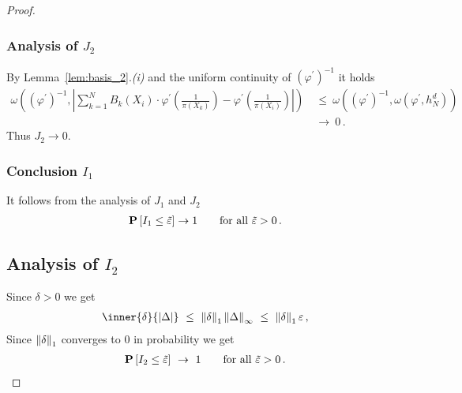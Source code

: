 \begin{proof}
\subsubsection*{Analysis of $J_2$}
By Lemma~\ref{lem:basis_2}.\textit{(i)}
and the uniform continuity of 
$
  (
  \varphi^{'}
  )
  ^{-1}
$
it holds
\begin{align*}
\omega
\left(
  (
  \varphi^{'}
  )
  ^{-1}
  ,
  \left|
    \sum_{k=1}^{N}
  B_k(X_i)
  \cdot
  \varphi^{'}
  \left(
    \frac
    {1}
    {\pi(X_k)}
  \right)
  -
  \varphi^{'}
  \left(
    \frac
    {1}
    {\pi(X_i)}
  \right)
  \right|
  \right)
  &
  \ 
  \le
  \ 
\omega
\left(
  (
  \varphi^{'}
  )
  ^{-1}
  ,
\omega
\left(
  \varphi^{'}
  ,
  h_N^d
  \right)
  \right)
  \\
  &
  \ 
  \to
  \ 
  0
  \,.
\end{align*}
Thus $J_2\to 0$.
\subsubsection*{Conclusion $I_1$}
It follows from the analysis of $J_1$ and $J_2$
\begin{align*}
  \P
  \left[
  I_1 \le \tilde{\varepsilon}
  \right]
  \to 1
  \qquad
  \text{for all}\ 
  \tilde{\varepsilon}>0
  \,.
\end{align*}
\subsection*{Analysis of $I_2$}
Since
$\delta>0$
we get
\begin{align*}
     \inner{\delta}
     {|\Delta|}
     \ 
     \le
     \ 
     \norm{\delta}_1
     \norm{\Delta}_\infty
     \ 
     \le
     \ 
     \norm{\delta}_1
     \varepsilon
     \,,
\end{align*}
Since $\left\lVert\delta\right\rVert_1$ converges to $0$ in probability we get
\begin{align*}
  \P
  \left[
  I_2 \le \tilde{\varepsilon}
  \right]
  \ 
  \to
  \ 
  1
  \qquad
  \text{for all}\ 
  \tilde{\varepsilon}>0
  \,.
\end{align*}

\end{proof}
